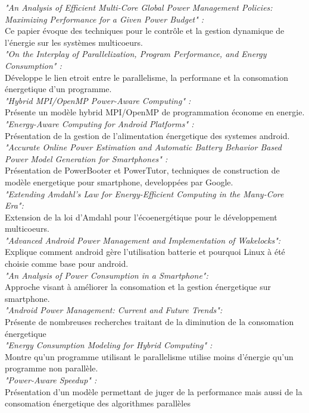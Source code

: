 	\textit {"An Analysis of Efficient Multi-Core Global Power Management Policies: Maximizing Performance for a Given Power Budget" :} \\
		Ce papier évoque des techniques pour le contrôle et la gestion dynamique de l'énergie sur les systèmes multicoeurs.\\

	\textit {"On the Interplay of Parallelization, Program Performance, and Energy Consumption" :}\\
		Développe le lien etroit entre le parallelisme, la performane et la consomation énergetique d'un programme.\\

	\textit {"Hybrid MPI/OpenMP Power-Aware Computing" :}\\
		Présente un modèle hybrid MPI/OpenMP de programmation économe en energie.\\

	\textit {"Energy-Aware Computing for Android Platforms" :}\\
		Présentation de la gestion de l'alimentation énergetique des systemes android.\\ 

	\textit {"Accurate Online Power Estimation and Automatic Battery Behavior Based Power Model Generation for Smartphones" : }\\
		Présentation de PowerBooter et PowerTutor, techniques de construction de modèle energetique pour smartphone, developpées par Google.\\

	\textit {"Extending Amdahl’s Law for Energy-Efficient Computing in the Many-Core Era":}\\
		Extension de la loi d'Amdahl pour l'écoenergétique pour le développement multicoeurs.\\

	\textit {"Advanced Android Power Management and Implementation of Wakelocks":}\\
		Explique comment android gère l'utilisation batterie et pourquoi Linux à été choisie comme base pour android.\\

	\textit {"An Analysis of Power Consumption in a Smartphone":}\\
		Approche visant à améliorer la consomation et la gestion énergetique sur smartphone.\\

	\textit {"Android Power Management: Current and Future Trends":}\\
		Présente de nombreuses recherches traitant de la diminution de la consomation énergetique \\

	\textit {"Energy Consumption Modeling for Hybrid Computing" :}\\
		Montre qu'un programme utilisant le parallelisme utilise moins d'énergie qu'un programme non parallèle.\\

	\textit {"Power-Aware Speedup" : }\\
		Présentation d'un modèle permettant de juger de la performance mais aussi de la consomation énergetique des algorithmes parallèles\\